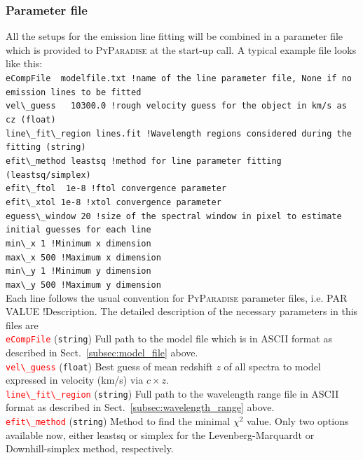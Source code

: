 \documentclass[usenatbib,usegraphicx,useAMS,onecolumn]{mn2e}
\newcommand{\codeline}[1]{\lstinline|#1|}
\newcommand{\paramdef}[1]{\textcolor{red}{\codeline{#1}}}
\begin{document}
\subsubsection{Parameter file}
All the setups for the emission line fitting will be combined in a parameter file which is provided to \textsc{PyParadise} at the start-up call. A typical example file looks like this:\bigskip\\
\codeline{eCompFile  modelfile.txt !name of the line parameter file, None if no emission lines to be fitted}\\
\codeline{vel\_guess   10300.0 !rough velocity guess for the object in km/s as cz (float)}\\
\codeline{line\_fit\_region lines.fit !Wavelength regions considered during the fitting (string)}\\
\codeline{efit\_method leastsq !method for line parameter fitting (leastsq/simplex)}\\
\codeline{efit\_ftol  1e-8 !ftol convergence parameter}\\
\codeline{efit\_xtol 1e-8 !xtol convergence parameter}\\
\codeline{eguess\_window 20 !size of the spectral window in pixel to estimate initial guesses for each line}\\
\codeline{min\_x 1 !Minimum x dimension}\\
\codeline{max\_x 500 !Maximum x dimension}\\
\codeline{min\_y 1 !Minimum y dimension}\\
\codeline{max\_y 500 !Maximum y dimension}\bigskip\\
Each line follows the usual convention for \textsc{PyParadise} parameter files, i.e. PAR VALUE !Description. The detailed description of the necessary parameters in this files are\\
\paramdef{eCompFile} (\texttt{string})  Full path to the model file which is in ASCII format as described in Sect.~\ref{subsec:model_file} above.\\
\paramdef{vel\_guess} (\texttt{float})  Best guess of mean redshift $z$ of all spectra to model expressed in velocity (km/s) via $c\times z$.\\
\paramdef{line\_fit\_region} (\texttt{string}) Full path to the wavelength range file in ASCII format as described in Sect.~\ref{subsec:wavelength_range} above.\\
\paramdef{efit\_method} (\texttt{string}) Method to find the minimal $\chi^2$ value. Only two options available now, either leastsq or simplex for the Levenberg-Marquardt or Downhill-simplex method, respectively.\\
\end{document}
